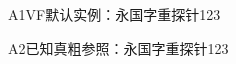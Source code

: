 \documentclass[fontset=none]{ctexart}
\begin{document}
\fontsize{22pt}{36pt}\selectfont
A1VF默认实例：永国字重探针123

A2已知真粗参照：{\msyhB 永国字重探针123}
\end{document}
